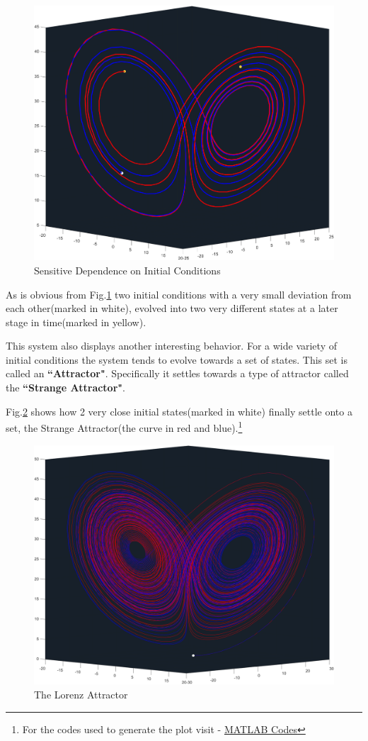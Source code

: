 \documentclass[14pts]{article}
\begin{document}
    \begin{figure}[h]
        \centering
        \includegraphics[width = \textwidth]{Images/Lorenz_Divergence.png}
        \caption{Sensitive Dependence on Initial Conditions}
        \label{fig:LorenzDiverge}
    \end{figure}

	As is obvious from Fig.\ref{fig:LorenzDiverge} two initial conditions with a very small deviation from each other(marked in white), evolved into two very different states at a later stage in time(marked in yellow).

    This system also displays another interesting behavior. For a wide variety of initial conditions the system tends to evolve towards a set of states. This set is called an \textbf{``Attractor"}.
    Specifically it settles towards a type of attractor called the \textbf{``Strange Attractor"}.

    Fig.\ref{fig:LorenzAttractor} shows how 2 very close initial states(marked in white) finally settle onto a set, the Strange Attractor(the curve in red and blue).\footnote[2]{For the codes used to generate the plot visit - \href{https://github.com/atharvaaalok/AS2101_Mandelbrot_Lorenz/tree/main/MATLAB}{MATLAB Codes}}

    \begin{figure}[h]
        \centering
        \includegraphics[width = \textwidth]{Images/Lorenz_Attractor.png}
        \caption{The Lorenz Attractor}
        \label{fig:LorenzAttractor}
    \end{figure}

	
\end{document}
